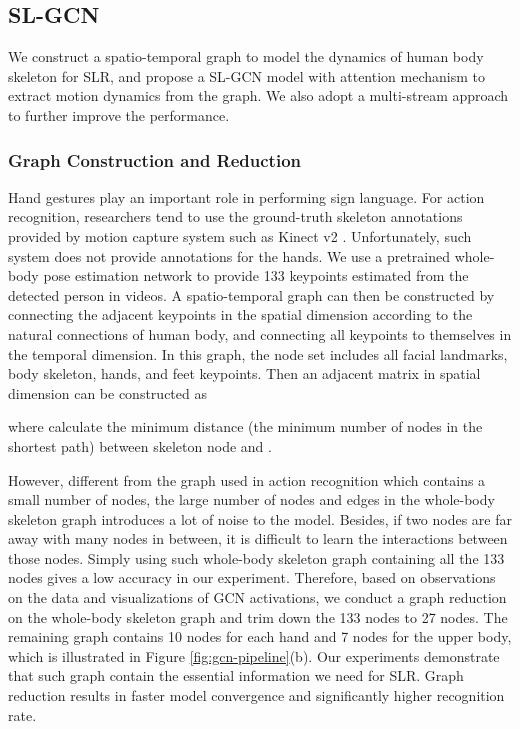 \documentclass[final]{cvpr}
\begin{document}
\subsection{SL-GCN}

We construct a spatio-temporal graph to model the dynamics of human body skeleton for SLR, and propose a SL-GCN model with attention mechanism to extract motion dynamics from the graph. We also adopt a multi-stream approach to further improve the performance.

\subsubsection{Graph Construction and Reduction}
\label{sec:graph_construction}
Hand gestures play an important role in performing sign language. For action recognition, researchers tend to use the ground-truth skeleton annotations provided by motion capture system such as Kinect v2 \cite{kinect_v1v2}. Unfortunately, such system does not provide annotations for the hands. We use a pretrained whole-body pose estimation network to provide 133 keypoints estimated from the detected person in videos. A spatio-temporal graph can then be constructed by connecting the adjacent keypoints in the spatial dimension according to the natural connections of human body, and connecting all keypoints to themselves in the temporal dimension. In this graph, the node set  includes all facial landmarks, body skeleton, hands, and feet keypoints. Then an adjacent matrix  in spatial dimension can be constructed as

where  calculate the minimum distance (the minimum number of nodes in the shortest path) between skeleton node  and . 

However, different from the graph used in action recognition which contains a small number of nodes, the large number of nodes and edges in the whole-body skeleton graph introduces a lot of noise to the model. Besides, if two nodes are far away with many nodes in between, it is difficult to learn the interactions between those nodes. Simply using such whole-body skeleton graph containing all the 133 nodes gives a low accuracy in our experiment. Therefore, based on observations on the data and visualizations of GCN activations, we conduct a graph reduction on the whole-body skeleton graph and trim down the 133 nodes to 27 nodes. The remaining graph contains 10 nodes for each hand and 7 nodes for the upper body, which is illustrated in Figure \ref{fig:gcn-pipeline}(b). Our experiments demonstrate that such graph contain the essential information we need for SLR. Graph reduction results in faster model convergence and significantly higher recognition rate.
\end{document}
